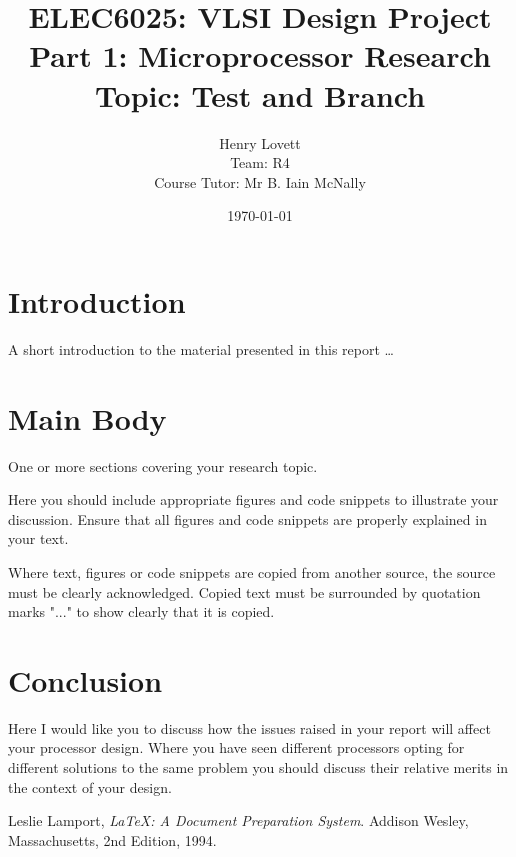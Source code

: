 \documentclass[12pt,a4paper]{article}
\title{ELEC6025: VLSI Design Project \\Part 1: Microprocessor Research\\Topic: Test and Branch}
\author{Henry Lovett\\ Team: R4\\Course Tutor: Mr B. Iain McNally}
\date{\today}
\begin{document}
\begin{titlepage}
\maketitle
\end{titlepage}

\tableofcontents
\clearpage

\section{Introduction}
A short introduction to the material presented in this report \dots\citep{greenwade93}

\section{Main Body}
One or more sections covering your research topic.

Here you should include appropriate figures and code snippets to illustrate your discussion. Ensure that all figures and code snippets are properly explained in your text.

Where text, figures or code snippets are copied from another source, the source must be clearly acknowledged. Copied text must be surrounded by quotation marks "..." to show clearly that it is copied. 

\section{Conclusion}
Here I would like you to discuss how the issues raised in your report will affect your processor design. Where you have seen different processors opting for different solutions to the same problem you should discuss their relative merits in the context of your design. 



\renewcommand{\refname}{Bibliography}
\begin{thebibliography}{9}

  Leslie Lamport,
  \emph{\LaTeX: A Document Preparation System}.
  Addison Wesley, Massachusetts,
  2nd Edition,
  1994.

\end{thebibliography}
\end{document}
